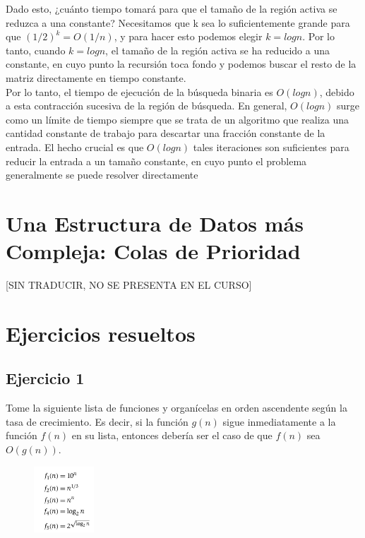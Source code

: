 \documentclass[a4paper, 12pt]{book}
\theoremstyle{dotless}
\begin{document}
Dado esto, ¿cuánto tiempo tomará para que el tamaño de la región activa se reduzca a una
constante? Necesitamos que k sea lo suficientemente grande para que $(1/2)^k=O(1/n)$, y para hacer
esto podemos elegir $k=log n$. Por lo tanto, cuando $k=log n$, el tamaño de la región activa se ha
reducido a una constante, en cuyo punto la recursión toca fondo y podemos buscar el resto de la matriz
directamente en tiempo constante.\\

Por lo tanto, el tiempo de ejecución de la búsqueda binaria es $O(log n)$, debido a esta
contracción sucesiva de la región de búsqueda. En general, $O(log n)$ surge como un límite de tiempo
siempre que se trata de un algoritmo que realiza una cantidad constante de trabajo para descartar una
fracción constante de la entrada. El hecho crucial es que $O(log n)$ tales iteraciones son suficientes para
reducir la entrada a un tamaño constante, en cuyo punto el problema generalmente se puede resolver
directamente\\

\section{Una Estructura de Datos más Compleja: Colas de Prioridad}

[SIN TRADUCIR, NO SE PRESENTA EN EL CURSO]

\section{Ejercicios resueltos}

\subsection*{Ejercicio 1} 

Tome la siguiente lista de funciones y organícelas en orden ascendente según la tasa de crecimiento. Es decir, si la función $g(n)$ sigue inmediatamente a la función $f(n)$ en su lista, entonces debería ser el caso de que $f(n)$ sea $O(g(n))$.\\

\begin{figure}[h] 
  \centering
    \includegraphics[width=0.2\textwidth]{Imagenes-Seccion2/form2_1.PNG}
\end{figure}
\end{document}
